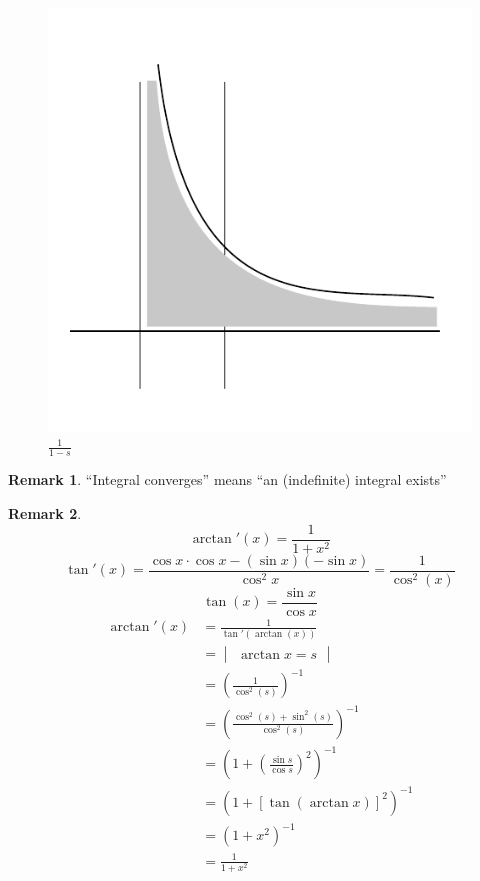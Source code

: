 \documentclass[a4paper,landscape,twocolumn]{article}
\theoremstyle{definition}
\newtheorem{rem}{Remark}
\begin{document}
\begin{figure}[t]
  \begin{center}
    \includegraphics{img/1divsmin1.pdf}
    \caption{$\frac{1}{1 - s}$}
    \label{img:1divs}
  \end{center}
\end{figure}

\begin{rem}
  \enquote{Integral converges} means \enquote{an (indefinite) integral exists}
\end{rem}

\begin{rem}
  \[ \arctan'(x) = \frac{1}{1 + x^2} \]
  \[ \tan'(x) = \frac{\cos{x} \cdot \cos{x} - (\sin{x}) (-\sin{x})}{\cos^2{x}} = \frac{1}{\cos^2(x)} \]
  \[ \tan(x) = \frac{\sin{x}}{\cos{x}} \]
  \begin{align*}
    \arctan'(x)
      &= \frac{1}{\tan'(\arctan(x))} \\
      &= \begin{vmatrix} \arctan{x} = s \end{vmatrix} \\
      &= \left(\frac{1}{\cos^2(s)}\right)^{-1} \\
      &= \left(\frac{\cos^2(s) + \sin^2(s)}{\cos^2(s)}\right)^{-1} \\
      &= \left(1 + \left(\frac{\sin{s}}{\cos{s}}\right)^2\right)^{-1} \\
      &= \left(1 + \left[\tan(\arctan{x})\right]^2\right)^{-1} \\
      &= (1 + x^2)^{-1} \\
      &= \frac{1}{1 + x^2}
  \end{align*}
\end{rem}
\end{document}
